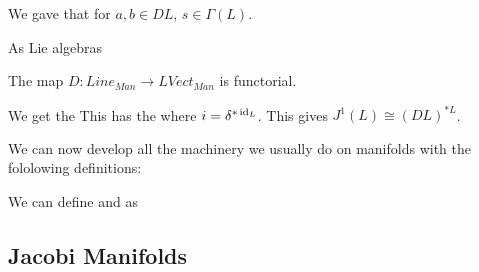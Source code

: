 \documentclass{article}
\begin{document}
We gave that for $a,b \in DL, \, s \in \Gamma(L)$. 

\begin{prop}
	As Lie algebras
\end{prop}

\begin{prop}
	The map $D : Line_{Man} \to LVect_{Man}$ is functorial. 
\end{prop}

\begin{remark}
	We get the 
This has the  
where $i = \delta^{\ast \operatorname{id}_L}$. This gives $J^1(L) \cong (DL)^{\ast L}$.  
\end{remark}

We can now develop all the machinery we usually do on manifolds with the fololowing definitions:

\begin{definition}
	We can define  and  as 
\end{definition}


\subsection{Jacobi Manifolds}
\end{document}
